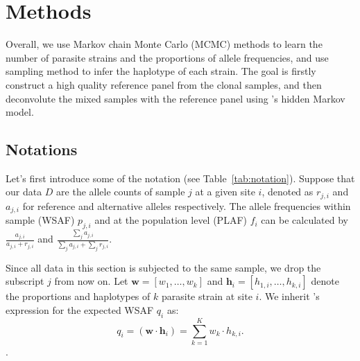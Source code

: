 \documentclass{bioinfo}
\begin{document}
\begin{methods}
\end{methods}

\section{Methods}
Overall, we use Markov chain Monte Carlo (MCMC) methods to learn the number of parasite strains and the proportions of allele frequencies, and use sampling method to infer the haplotype of each strain. The goal is firstly construct a high quality reference panel from the clonal samples, and then deconvolute the mixed samples with the reference panel using \citet{Li2003}'s hidden Markov model.


\subsection{Notations}
Let's first introduce some of the notation (see Table~\ref{tab:notation}). Suppose that our data $D$ are the allele counts of sample $j$ at a given site $i$, denoted as $r_{j,i}$ and $a_{j,i}$ for reference and alternative alleles respectively. The allele frequencies within sample (WSAF) $p_{j,i}$ and at the population level (PLAF) $f_i$ can be calculated by $ \frac{a_{j,i}}{a_{j,i} + r_{j,i}}$ and $ \frac{\sum_j a_{j,i}}{\sum_j a_{j,i} + \sum_j r_{j,i}}$.

Since all data in this section is subjected to the same sample, we drop the subscript $j$ from now on. Let $\mathbf w = [w_1,\dots, w_k]$ and $\mathbf{h}_{i} = [h_{1,i},\dots,h_{k,i}]$ denote the proportions and haplotypes of $k$ parasite strain at site $i$. We inherit \citet{Jack2016}'s expression for the expected WSAF $q_{i}$ as:
\begin{equation}
q_i= (\mathbf{w}\cdot\mathbf{h}_{i})  =  \sum_{k=1}^{K} w_k \cdot h_{k,i} .\label{eqn:qij_full_sum}
\end{equation}.
\end{document}
